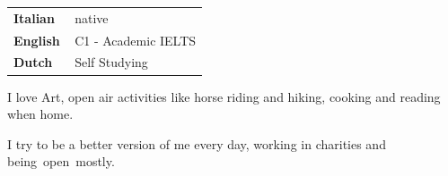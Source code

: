 \documentclass[9pt]{developercv} %
\begin{document}

\begin{minipage}[t]{0.3\textwidth}
	\vspace{-\baselineskip} %

    
	\begin{tabular}{l l}
    \textbf{Italian} \quad \quad & \,native \\
	\textbf{English     } & \,C1 - Academic IELTS\\
    \textbf{Dutch} & \,Self Studying

    \end{tabular}
\end{minipage}
\hfill
\begin{minipage}[t]{0.3\textwidth}
	\vspace{-\baselineskip} %
    
    
	I love Art, open air activities like horse riding and hiking, cooking and reading when home.
\end{minipage}
\hfill
\begin{minipage}[t]{0.3\textwidth}
	\vspace{-\baselineskip} %
	
    I try to be a better version of me \linebreak every day, working in charities and \linebreak \mbox{being open mostly.} \linebreak
\end{minipage}
\end{document}
